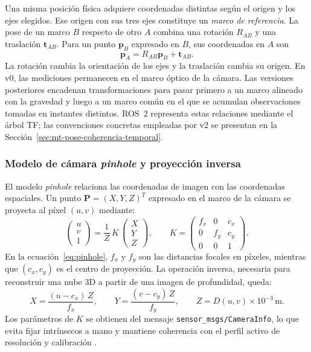 Una misma posición física adquiere coordenadas distintas según el origen y los ejes elegidos.
Ese origen con sus tres ejes constituye un \emph{marco de referencia}. La pose de un marco $B$
respecto de otro $A$ combina una rotación $R_{AB}$ y una traslación $\mathbf t_{AB}$. Para un
punto $\mathbf p_B$ expresado en $B$, sus coordenadas en $A$ son
\begin{equation}
  \mathbf p_A=R_{AB}\mathbf p_B+\mathbf t_{AB}.
  \label{eq:rigid-transform-intro}
\end{equation}
La rotación cambia la orientación de los ejes y la traslación cambia su origen. En v0, las
mediciones permanecen en el marco óptico de la cámara. Las versiones posteriores encadenan
transformaciones para pasar primero a un marco alineado con la gravedad y luego a un marco común
en el que se acumulan observaciones tomadas en instantes distintos. ROS~2 representa estas
relaciones mediante el árbol TF; las convenciones concretas empleadas por v2 se presentan en la
Sección~\ref{sec:mt-pose-coherencia-temporal}.

\subsubsection{Modelo de cámara \emph{pinhole} y proyección inversa}

El modelo \emph{pinhole} relaciona las coordenadas de imagen con las coordenadas espaciales.
Un punto
$\mathbf{P}=(X,Y,Z)^T$ expresado en el marco de la cámara se proyecta al píxel $(u,v)$
mediante:
\begin{equation}
  \begin{pmatrix} u \\ v \\ 1 \end{pmatrix}
  = \frac{1}{Z}\,K\,\begin{pmatrix} X \\ Y \\ Z \end{pmatrix}, \qquad
  K =
  \begin{pmatrix}
    f_x & 0 & c_x \\
    0 & f_y & c_y \\
    0 & 0 & 1
  \end{pmatrix}.
  \label{eq:pinhole}
\end{equation}
En la ecuación~\ref{eq:pinhole}, $f_x$ y $f_y$ son las distancias focales en píxeles,
mientras que $(c_x,c_y)$ es el centro de proyección. La operación inversa, necesaria para
reconstruir una nube 3D a partir de una imagen de profundidad, queda:
\begin{equation}
  X = \frac{(u-c_x)\,Z}{f_x}, \qquad
  Y = \frac{(v-c_y)\,Z}{f_y}, \qquad
  Z = D(u,v)\times 10^{-3}\,\text{m}.
  \label{eq:pinhole-inv}
\end{equation}
Los parámetros de $K$ se obtienen del mensaje \texttt{sensor\_msgs/CameraInfo}, lo que evita
fijar intrínsecos a mano y mantiene coherencia con el perfil activo de resolución y
calibración
\cite{Hartley2004}.

